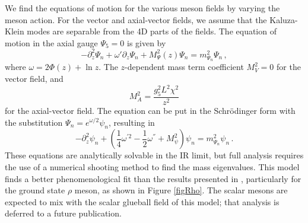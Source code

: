 \documentclass[aps,prd,12pt,nofootinbib]{revtex4}
\newcommand{\be}{\begin{equation}}
\newcommand{\ee}{\end{equation}}
\def\thalf{{\textstyle{\frac{1}{2}}}}
\def\oneqt{{\textstyle{\frac{1}{4}}}}
\begin{document}
We find the equations of motion for the various meson fields by varying the meson action.
For the vector and axial-vector fields, we  assume that the Kaluza-Klein modes are separable from the 4D parts of the fields.
The equation of motion in the axial gauge $\Psi_5=0$  is given by
\be
-\partial_z^2\Psi_n+\omega'\partial_z\Psi_n +M_\Psi^2(z) \Psi_n=m^2_{\Psi_n}\Psi_n \, ,
\ee
where $\omega=2\Phi(z)+\ln z$. 
The $z$-dependent mass term coefficient $M^2_V=0$  for the vector field, and 
\be
M^2_A=\frac{g_5^2L^2\chi^2}{z^2}
\ee
for the axial-vector field.
The equation can be put in the Schr{\"o}dinger form with the substitution $\Psi_n=e^{\omega/2}\psi_n$, resulting in
\be
-\partial^2_z\psi_n+\left(\oneqt \omega^{'2}-\thalf\omega^{''}+M_\psi^2\right)\psi_n=m^2_{\Psi_n}\psi_n \, .
\ee
These equations are analytically solvable in the IR limit, but full analysis requires the use of a numerical shooting method to find the mass eigenvalues.
This model finds a better phenomenological fit than the results presented in \cite{gherghetta-kelley}, particularly for the ground state $\rho$ meson, as shown in Figure \ref{figRho}. 
The scalar mesons are expected to mix with the scalar glueball field of this model; that analysis is deferred to a future publication. 
\end{document}
